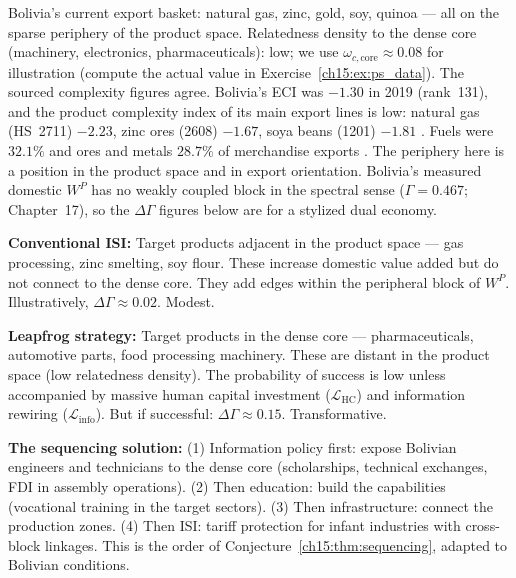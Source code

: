\documentclass[../structural_economics_book.tex]{subfiles}
\begin{document}
\begin{example}\label{ch15:ex:bolivia_ps}
Bolivia's current export basket: natural gas, zinc, gold, soy, quinoa --- all on the sparse periphery of the product space. Relatedness density to the dense core (machinery, electronics, pharmaceuticals): low; we use $\omega_{c,\text{core}} \approx 0.08$ for illustration (compute the actual value in Exercise~\ref{ch15:ex:ps_data}). The sourced complexity figures agree. Bolivia's ECI was $-1.30$ in 2019 (rank~131), and the product complexity index of its main export lines is low: natural gas (HS~2711) $-2.23$, zinc ores (2608) $-1.67$, soya beans (1201) $-1.81$ \citep{growthlab2026atlas}. Fuels were $32.1\%$ and ores and metals $28.7\%$ of merchandise exports \citep{worldbank2026wdi}. The periphery here is a position in the product space and in export orientation. Bolivia's measured domestic $W^P$ has no weakly coupled block in the spectral sense ($\Gamma = 0.467$; Chapter~17), so the $\Delta\Gamma$ figures below are for a stylized dual economy.

\textbf{Conventional ISI:} Target products adjacent in the product space --- gas processing, zinc smelting, soy flour. These increase domestic value added but do not connect to the dense core. They add edges within the peripheral block of $W^P$. Illustratively, $\Delta\Gamma \approx 0.02$. Modest.

\textbf{Leapfrog strategy:} Target products in the dense core --- pharmaceuticals, automotive parts, food processing machinery. These are distant in the product space (low relatedness density). The probability of success is low unless accompanied by massive human capital investment ($\mathcal{L}_{\text{HC}}$) and information rewiring ($\mathcal{L}_{\text{info}}$). But if successful: $\Delta\Gamma \approx 0.15$. Transformative.

\textbf{The sequencing solution:} (1) Information policy first: expose Bolivian engineers and technicians to the dense core (scholarships, technical exchanges, FDI in assembly operations). (2) Then education: build the capabilities (vocational training in the target sectors). (3) Then infrastructure: connect the production zones. (4) Then ISI: tariff protection for infant industries with cross-block linkages. This is the order of Conjecture~\ref{ch15:thm:sequencing}, adapted to Bolivian conditions.
\end{example}


\end{document}
